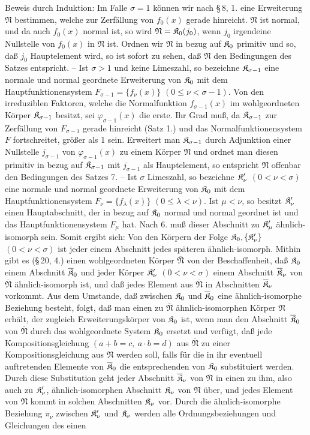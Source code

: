 Beweis durch Induktion: Im Falle $\sigma=1$ können wir nach \S\,8, 1. eine Erweiterung $\mathfrak N$ bestimmen, welche zur Zerfällung von $f_0(x)$ gerade hinreicht. $\mathfrak N$ ist normal, und da auch $f_0(x)$ normal ist, so wird $\mathfrak N=\mathfrak K_0(j_0)$, wenn $j_0$ irgendeine Nullstelle von $f_0(x)$ in $\mathfrak N$ ist. Ordnen wir $\mathfrak N$ in bezug auf $\mathfrak K_0$ primitiv und so, daß $j_0$ Hauptelement wird, so ist sofort zu sehen, daß $\mathfrak N$ den Bedingungen des Satzes entspricht. -- Ist $\sigma>1$ und keine Limeszahl, so bezeichne $\mathfrak K_{\sigma-1}$ eine normale und normal geordnete Erweiterung von $\mathfrak K_0$ mit dem Hauptfunktionensystem $F_{\sigma-1}=\{f_\nu(x)\}$ $(0\leq\nu<\sigma-1)$. Von den irreduziblen Faktoren, welche die Normalfunktion $f_{\sigma-1}(x)$ im wohlgeordneten Körper $\mathfrak K_{\sigma-1}$ besitzt, sei $\varphi_{\sigma-1}(x)$ die erste. Ihr Grad muß, da $\mathfrak K_{\sigma-1}$ zur Zerfällung von $F_{\sigma-1}$ gerade hinreicht (Satz 1.) und das Normalfunktionensystem $F$ fortschreitet, größer als 1 sein. Erweitert man $\mathfrak K_{\sigma-1}$ durch Adjunktion einer Nullstelle $j_{\sigma-1}$ von $\varphi_{\sigma-1}(x)$ zu einem Körper $\mathfrak N$ und ordnet man diesen primitiv in bezug auf $\mathfrak K_{\sigma-1}$ mit $j_{\sigma-1}$ als Hauptelement, so entspricht $\mathfrak N$ offenbar den Bedingungen des Satzes 7. -- Ist $\sigma$ Limeszahl, so bezeichne $\mathfrak K_\nu'$ $(0<\nu<\sigma)$ eine normale und normal geordnete Erweiterung von $\mathfrak K_0$ mit dem Hauptfunktionensystem $F_\nu=\{f_\lambda(x)\}$ $(0\leq\lambda<\nu)$. Ist $\mu<\nu$, so besitzt $\mathfrak K_\nu'$ einen Hauptabschnitt, der in bezug auf $\mathfrak K_0$ normal und normal geordnet ist und das Hauptfunktionensystem $F_\mu$ hat. Nach 6. muß dieser Abschnitt zu $\mathfrak K_\mu'$ ähnlich-isomorph sein. Somit ergibt sich: Von den Körpern der Folge $\mathfrak K_0,\{\mathfrak K_\nu'\}$ $(0<\nu<\sigma)$ ist jeder einem Abschnitt jedes späteren ähnlich-isomorph. Mithin gibt es (\S\,20, 4.) einen wohlgeordneten Körper $\overline{\mathfrak N}$ von der Beschaffenheit, daß $\mathfrak K_0$ einem Abschnitt $\overline{\mathfrak K}_0$ und jeder Körper $\mathfrak K_\nu'$ $(0<\nu<\sigma)$ einem Abschnitt $\overline{\mathfrak K}_\nu$ von $\overline{\mathfrak N}$ ähnlich-isomorph ist, und daß jedes Element aus $\overline{\mathfrak N}$ in Abschnitten $\overline{\mathfrak K}_\nu$ vorkommt. Aus dem Umstande, daß zwischen $\mathfrak K_0$ und $\overline{\mathfrak K}_0$ eine ähnlich-isomorphe Beziehung besteht, folgt, daß man einen zu $\overline{\mathfrak N}$ ähnlich-isomorphen Körper $\mathfrak N$ erhält, der zugleich Erweiterungskörper von $\mathfrak K_0$ ist, wenn man den Abschnitt $\overline{\mathfrak K}_0$ von $\overline{\mathfrak N}$ durch das wohlgeordnete System $\mathfrak K_0$ ersetzt und verfügt, daß jede Kompositionsgleichung $(a+b=c,\ a\cdot b=d)$ aus $\overline{\mathfrak N}$ zu einer Kompositionsgleichung aus $\mathfrak N$ werden soll, falls für die in ihr eventuell auftretenden Elemente von $\overline{\mathfrak K}_0$ die entsprechenden von $\mathfrak K_0$ substituiert werden. Durch diese Substitution geht jeder Abschnitt $\overline{\mathfrak K}_\nu$ von $\overline{\mathfrak N}$ in einen zu ihm, also auch zu $\mathfrak K_\nu'$, ähnlich-isomorphen Abschnitt $\mathfrak K_\nu$ von $\mathfrak N$ über, und jedes Element von $\mathfrak N$ kommt in solchen Abschnitten $\mathfrak K_\nu$ vor. Durch die ähnlich-isomorphe Beziehung $\pi_\nu$ zwischen $\mathfrak K_\nu'$ und $\mathfrak K_\nu$ werden alle Ordnungsbeziehungen und Gleichungen des einen 